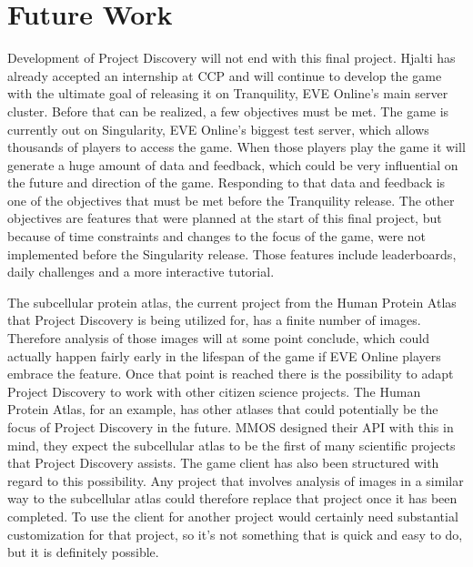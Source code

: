 \section{Future Work}\label{sec:futurework}
Development of Project Discovery will not end with this final project. Hjalti has already accepted an internship at CCP and will continue to develop the game with the ultimate goal of releasing it on Tranquility, EVE Online's main server cluster. Before that can be realized, a few objectives must be met. The game is currently out on Singularity, EVE Online's biggest test server, which allows thousands of players to access the game. When those players play the game it will generate a huge amount of data and feedback, which could be very influential on the future and direction of the game. Responding to that data and feedback is one of the objectives that must be met before the Tranquility release. The other objectives are features that were planned at the start of this final project, but because of time constraints and changes to the focus of the game, were not implemented before the Singularity release. Those features include leaderboards, daily challenges and a more interactive tutorial. 


The subcellular protein atlas, the current project from the Human Protein Atlas that Project Discovery is being utilized for, has a finite number of images. Therefore analysis of those images will at some point conclude, which could actually happen fairly early in the lifespan of the game if EVE Online players embrace the feature. Once that point is reached there is the possibility to adapt Project Discovery to work with other citizen science projects. The Human Protein Atlas, for an example, has other atlases that could potentially be the focus of Project Discovery in the future. MMOS designed their API with this in mind, they expect the subcellular atlas to be the first of many scientific projects that Project Discovery assists. The game client has also been structured with regard to this possibility. Any project that involves analysis of images in a similar way to the subcellular atlas could therefore replace that project once it has been completed. To use the client for another project would certainly need substantial customization for that project, so it's not something that is quick and easy to do, but it is definitely possible.